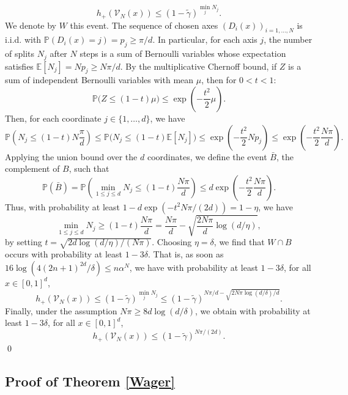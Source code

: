 \documentclass[paper=a4, fontsize=11pt]{scrartcl}
\newcommand{\PP}{\mathbb{P}}
\begin{document}
$$h_{+}(\mathcal{V}_N(x)) \leq (1 - \tilde{\gamma})^{\min_{j} N_j}.$$ 
We denote by $W$ this event. The sequence of chosen axes $(D_i(x))_{i=1,\dots,N}$ is i.i.d. with $\PP(D_i(x)=j)=p_j \ge \pi/d$. In particular, for each axis $j$, the number of splits $N_j$ after $N$ steps is a sum of Bernoulli variables whose expectation satisfies $\mathbb{E}[N_j]=N p_j \ge N\pi/d$. By the multiplicative Chernoff bound, if $Z$ is a sum of independent Bernoulli variables with mean $\mu$, then for $0 < t < 1$:
$$\PP\big(Z \le (1- t)\mu\big) \le \exp\!\left(-\frac{t^2}{2}\mu\right).$$ 
Then, for each coordinate $j \in \{1, \dots, d\}$, we have 
$$\PP\left( N_j \le (1-t) N \frac{\pi}{d}\right) \leq \PP\Big( N_j \le (1-t) \mathbb{E}[N_j] \Big) \le \exp\!\left(-\frac{t^2}{2}N p_j\right)\le \exp\!\left(-\frac{t^2}{2}  \frac{N\pi}{d}\right) .$$
Applying the union bound over the $d$ coordinates, we define the event $\bar{B} $, the complement of $B$, such that 
$$\PP(\bar{B}) = \PP\left( \min_{1\le j\le d} N_j \le (1-t) \frac{N\pi}{d}\right) \leq d \exp\!\left(-\frac{t^2}{2}  \frac{N\pi}{d}\right) .$$
Thus, with probability at least $1 - d\exp\!(-{t^2N\pi }/{(2d)} ) = 1-\eta$, we have
$$\min_{1\le j\le d} N_j \ge (1-t)  \frac{N\pi}{d} =  \frac{N\pi}{d}  - \sqrt{\frac{2N\pi}{d} \log(d/\eta)},$$
by setting $t = \sqrt{2d\log(d/\eta)/(N\pi)}$. Choosing $\eta = \delta$, we find that $W \cap B$ occurs with probability at least $1-3\delta$. That is, as soon as $16\log( 4 (2n+1)^{2d} / \delta) \leq n \alpha^{N}$, we have with probability at least $1-3\delta$, for all $x\in [0,1]^d$,
$$h_{+}(\mathcal{V}_N(x)) \le (1 - \tilde{\gamma})^{\min_j N_j} \le (1 - \tilde{\gamma})^{N \pi/d - \sqrt{2N\pi \log(d/\delta)/d}}.$$
Finally, under the assumption $N \pi \geq 8d \log(d/\delta)$, we obtain with probability at least $1-3\delta$, for all $x\in [0,1]^d$, 
$$h_{+}(\mathcal{V}_N(x))\le (1 - \tilde{\gamma})^{N \pi/(2d)}.$$ \qed

\subsection*{Proof of Theorem \ref{Wager}}
\end{document}
